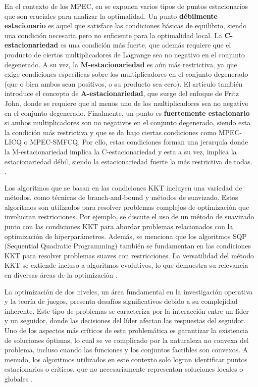 En el contexto de los MPEC, en \cite{Flegel2003AFJ} se exponen varios tipos de puntos estacionarios que son cruciales para analizar la optimalidad. Un punto \textbf{débilmente estacionario} es aquel que satisface las condiciones básicas de equilibrio, siendo una condición necesaria pero no suficiente para la optimalidad local. La \textbf{C-estacionariedad} es una condición más fuerte, que además requiere que el producto de ciertos multiplicadores de Lagrange sea no negativo en el conjunto degenerado. A su vez, la \textbf{M-estacionariedad} es aún más restrictiva, ya que exige condiciones específicas sobre los multiplicadores en el conjunto degenerado (que o bien ambos sean positivos, o su producto sea cero). El artículo también introduce el concepto de \textbf{A-estacionariedad}, que surge del enfoque de Fritz John, donde se requiere que al menos uno de los multiplicadores sea no negativo en el conjunto degenerado. Finalmente, un punto es \textbf{fuertemente estacionario} si ambos multiplicadores son no negativos en el conjunto degenerado, siendo esta la condición más restrictiva y que se da bajo ciertas condiciones como MPEC-LICQ o MPEC-SMFCQ. Por ello, estas condiciones forman una jerarquía donde la M-estacionariedad implica la C-estacionariedad y esta a su vez, implica la estacionariedad débil, siendo la estacionariedad fuerte la más restrictiva de todas. \cite{Flegel2003AFJ}.

Los algoritmos que se basan en las condiciones KKT incluyen una variedad de métodos, como técnicas de branch-and-bound y métodos de suavizado. Estos algoritmos son utilizados para resolver problemas complejos de optimización que involucran restricciones. Por ejemplo, se discute el uso de un método de suavizado junto con las condiciones KKT para abordar problemas relacionados con la optimización de hiperparámetros. Además, se menciona que los algoritmos SQP (Sequential Quadratic Programming) también se fundamentan en las condiciones KKT para resolver problemas suaves con restricciones. La versatilidad del método KKT se extiende incluso a algoritmos evolutivos, lo que demuestra su relevancia en diversas áreas de la optimización \cite{DempeyZemkoho2020}.

La optimización de dos niveles, un área fundamental en la investigación operativa y la teoría de juegos, presenta desafíos significativos debido a su complejidad inherente. Este tipo de problemas se caracteriza por la interacción entre un líder y un seguidor, donde las decisiones del líder afectan las respuestas del seguidor. Uno de los aspectos más críticos de esta problemática es garantizar la existencia de soluciones óptimas, lo cual se ve complicado por la naturaleza no convexa del problema, incluso cuando las funciones y los conjuntos factibles son convexos. A menudo, los algoritmos utilizados en este contexto solo logran identificar puntos estacionarios o críticos, que no necesariamente representan soluciones locales o globales \cite{DempeyZemkoho2020}.

